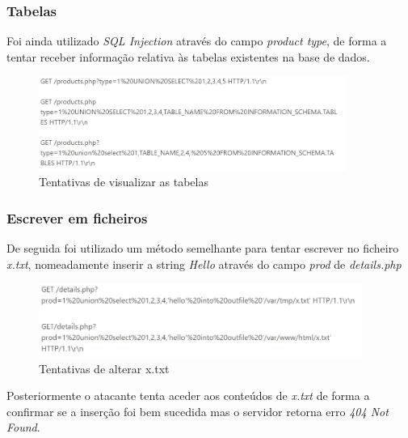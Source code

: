 \documentclass[10pt,english]{article}
\begin{document}
\subsubsection{Tabelas}
\par Foi ainda utilizado \textit{SQL Injection} através do campo \textit{product type}, de forma a tentar receber informação relativa às tabelas existentes na base de dados.

\begin{figure}[h]
    \centering
    \includegraphics[width=380]{images/TentativasTabelas.png}
    \caption{Tentativas de visualizar as tabelas}
\end{figure}

\subsubsection{Escrever em ficheiros}
\par De seguida foi utilizado um método semelhante para tentar escrever no ficheiro \textit{x.txt}, nomeadamente inserir a string \textit{Hello} através do campo \textit{prod} de \textit{details.php}
\begin{figure}[h]
    \centering
    \includegraphics[width=400]{images/TentativasX.png}
    \caption{Tentativas de alterar x.txt}
\end{figure}

\par Posteriormente o atacante tenta aceder aos conteúdos de \textit{x.txt} de forma a confirmar se a inserção foi bem sucedida mas o servidor  retorna erro \textit{404 Not Found}.
\end{document}
